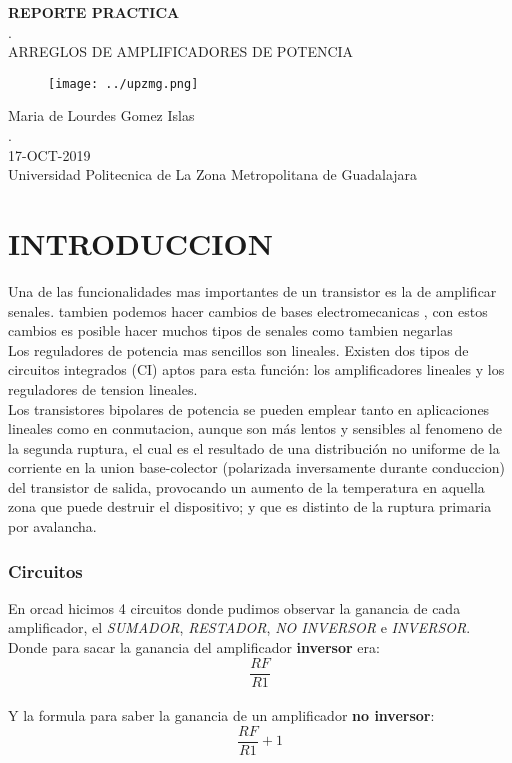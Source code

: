 \documentclass[11pt,a4paper]{article}
\begin{document}
\begin{center}
\textbf{REPORTE PRACTICA}\\
.\\
ARREGLOS DE AMPLIFICADORES DE POTENCIA
\end{center}

\begin{figure}[h]
\centering
\texttt{[image: ../upzmg.png]} 
\end{figure}

\begin{center}
Maria de Lourdes Gomez Islas\\
.\\
17-OCT-2019\\
Universidad Politecnica de La Zona Metropolitana de Guadalajara
\end{center}


\newpage

\part{INTRODUCCION}
Una de las funcionalidades mas importantes de un transistor es la de amplificar senales. tambien podemos hacer cambios de bases electromecanicas , con estos cambios es posible hacer muchos tipos de senales como tambien negarlas\\
Los reguladores de potencia mas sencillos son lineales. Existen dos tipos de circuitos integrados (CI) aptos para esta función: los amplificadores lineales y los reguladores de tension lineales.\\
Los transistores bipolares de potencia se pueden emplear tanto en aplicaciones lineales como en conmutacion, aunque son más lentos y sensibles al fenomeno de la segunda ruptura, el cual es el resultado de una distribución no uniforme de la corriente en la union base-colector (polarizada inversamente durante conduccion) del transistor de salida, provocando un aumento de la temperatura en aquella zona que puede destruir el dispositivo; y que es distinto de la ruptura primaria por avalancha.

\section{Circuitos}
En orcad hicimos 4 circuitos donde pudimos observar la ganancia de cada amplificador, el \emph{SUMADOR}, \emph{RESTADOR}, \emph{NO INVERSOR} e \emph{INVERSOR}.
Donde para sacar la ganancia del amplificador \textbf{inversor} era:\\
 $$ \frac{RF}{R1} $$\\
Y la formula para saber la ganancia de un amplificador \textbf{no inversor}:\\
$$ \frac{RF}{R1} + 1 $$\\
\end{document}
